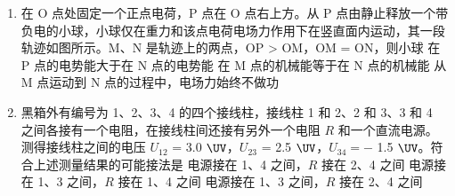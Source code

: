 \documentclass[\gkver]{gaokaozhenti}
\begin{document}
\begin{enumerate}
{则粒子做圆周运动有  $qvB = m \frac{v^{2}}{r}$

则有  $\frac{q}{m} = \frac{v}{2a \cdot B}$

如果保持所有条件不变，在磁场区域再加上电场强度大小为 E 的匀强电场，该粒子入射后则会沿 x 轴到达接收屏，则有

 $Eq = qvB$

联立有

 $\frac{q}{m} = \frac{E}{2a \cdot B^{2}}$

故选 A。
}

\item
在 O 点处固定一个正点电荷，P 点在 O 点右上方。从 P 点由静止释放一个带负电的小球，小球仅在重力和该点电荷电场力作用下在竖直面内运动，其一段轨迹如图所示。M、N 是轨迹上的两点，OP > OM，OM = ON，则小球
{在 P 点的电势能大于在 N 点的电势能}
{在 M 点的机械能等于在 N 点的机械能}
{从 M 点运动到 N 点的过程中，电场力始终不做功}

\item
黑箱外有编号为 1、2、3、4 的四个接线柱，接线柱 1 和 2、2 和 3、3 和 4 之间各接有一个电阻，在接线柱间还接有另外一个电阻 $R$ 和一个直流电源。测得接线柱之间的电压 $U_{12}$ = 3.0 $\UV$，$U_{23}$ = 2.5 $\UV$，$U_{34} = -$ 1.5 $\UV$。符合上述测量结果的可能接法是
\onepicture[w=6.6cm]{}
{电源接在 1、4 之间，$R$ 接在 2、4 之间}
{电源接在 1、3 之间，$R$ 接在 1、4 之间}
{电源接在 1、3 之间，$R$ 接在 2、4 之间}
\end{enumerate}
\end{document}
